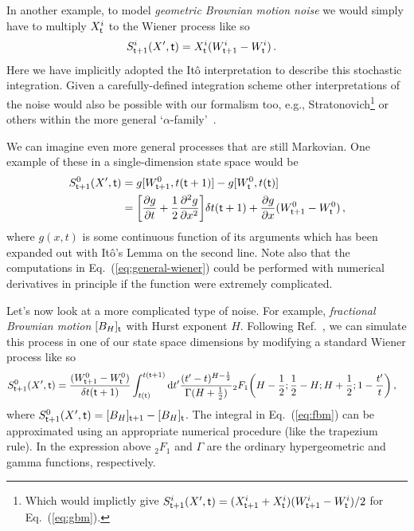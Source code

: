 \documentclass{book}
\begin{document}
In another example, to model \emph{geometric Brownian motion noise} we would simply have to multiply $X^i_{\sf t}$ to the Wiener process like so
\begin{align}
& S^{i}_{{\sf t}+1}(X',{\sf t}) = X^i_{\sf t}(W^i_{{\sf t}+1}-W^i_{\sf t})\label{eq:gbm} \,.
\end{align}
Here we have implicitly adopted the Itô interpretation to describe this stochastic integration. Given a carefully-defined integration scheme other interpretations of the noise would also be possible with our formalism too, e.g., Stratonovich\footnote{Which would implictly give $S^{i}_{{\sf t}+1}(X',{\sf t}) = (X^i_{{\sf t}+1}+X^i_{\sf t})(W^i_{{\sf t}+1}-W^i_{\sf t}) / 2$ for Eq.~(\ref{eq:gbm}).} or others within the more general `$\alpha$-family'~\cite{van1992stochastic,risken1996fokker,rog-will-2000}.

We can imagine even more general processes that are still Markovian. One example of these in a single-dimension state space would be
\begin{align}
S^0_{{\sf t}+1}(X',{\sf t}) &= g[W^0_{{\sf t}+1},t({\sf t}+1)]-g[W^0_{\sf t}, t({\sf t})] \\
&= \bigg[ \frac{\partial g}{\partial t} + \frac{1}{2}\frac{\partial^2 g}{\partial x^2} \bigg] \delta t ({\sf t}+1) + \frac{\partial g}{\partial x} (W^0_{{\sf t}+1}-W^0_{\sf t}) \label{eq:general-wiener}\,,
\end{align}
where $g(x,t)$ is some continuous function of its arguments which has been expanded out with Itô's Lemma on the second line. Note also that the computations in Eq.~(\ref{eq:general-wiener}) could be performed with numerical derivatives in principle if the function were extremely complicated.

Let's now look at a more complicated type of noise. For example, \emph{fractional Brownian motion} $[B_{H}]_{\sf t}$ with Hurst exponent $H$. Following Ref.~\cite{decreusefond1999stochastic}, we can simulate this process in one of our state space dimensions by modifying a standard Wiener process like so
\begin{align}
S^{0}_{{\sf t}+1}(X',{\sf t}) &= \frac{(W^0_{{\sf t}+1} - W^0_{\sf t})}{\delta t({\sf t}+1)}\int^{t({\sf t}+1)}_{t({\sf t})}{\rm d}t' \frac{(t'-t)^{H-\frac{1}{2}}}{\Gamma (H+\frac{1}{2})} {}_2F_1 \bigg( H-\frac{1}{2};\frac{1}{2}-H;H+\frac{1}{2};1-\frac{t'}{t}\bigg) \label{eq:fbm} \,,
\end{align}
where $S^{0}_{{\sf t}+1}(X',{\sf t})=[B_{H}]_{{\sf t}+1}-[B_{H}]_{{\sf t}}$. The integral in Eq.~(\ref{eq:fbm}) can be approximated using an appropriate numerical procedure (like the trapezium rule). In the expression above ${}_2F_1$ and $\Gamma$ are the ordinary hypergeometric and gamma functions, respectively.
\end{document}
